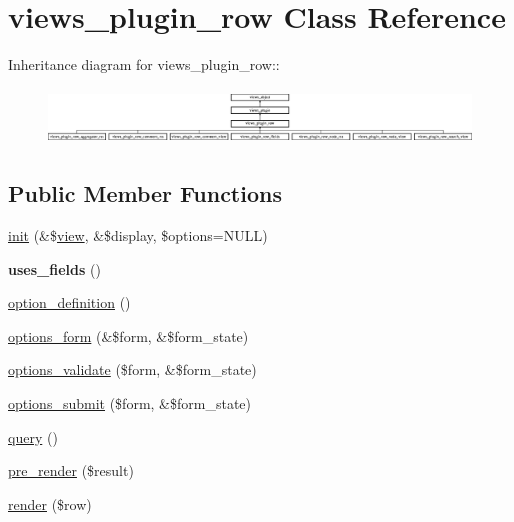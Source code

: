 \hypertarget{classviews__plugin__row}{
\section{views\_\-plugin\_\-row Class Reference}
\label{classviews__plugin__row}
}
Inheritance diagram for views\_\-plugin\_\-row::\begin{figure}[H]
\begin{center}
\leavevmode
\includegraphics[height=1.49533cm]{classviews__plugin__row}
\end{center}
\end{figure}
\subsection*{Public Member Functions}
\begin{CompactItemize}
\item 
\hyperlink{classviews__plugin__row_bf02e5f51e907c5009edda15d997c161}{init} (\&\$\hyperlink{classview}{view}, \&\$display, \$options=NULL)
\item 
\hypertarget{classviews__plugin__row_0f855a903177b1cbc5e84c1d5c3cce9a}{
\textbf{uses\_\-fields} ()}
\label{classviews__plugin__row_0f855a903177b1cbc5e84c1d5c3cce9a}

\item 
\hyperlink{classviews__plugin__row_ad6be1492eae8605e9aff37da9f19337}{option\_\-definition} ()
\item 
\hyperlink{classviews__plugin__row_6914c39d64977a0aa71da39cc1af004e}{options\_\-form} (\&\$form, \&\$form\_\-state)
\item 
\hyperlink{classviews__plugin__row_854979826451916d9b04517ad6e32840}{options\_\-validate} (\$form, \&\$form\_\-state)
\item 
\hyperlink{classviews__plugin__row_083534753b8e7e30d6d5b14d93f10bf4}{options\_\-submit} (\$form, \&\$form\_\-state)
\item 
\hyperlink{classviews__plugin__row_bfc5a6936d485f19d49cfd9eae094f8f}{query} ()
\item 
\hyperlink{classviews__plugin__row_e49a23f750874e4b3d294aa3a20ecd64}{pre\_\-render} (\$result)
\item 
\hyperlink{classviews__plugin__row_8243842e087dd28664b32cef0309f2a6}{render} (\$row)
\end{CompactItemize}


